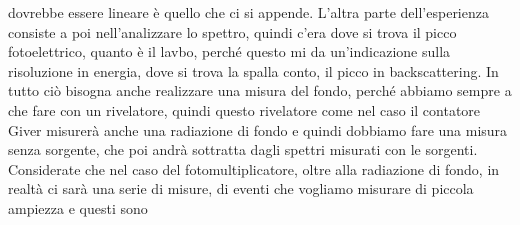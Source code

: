 dovrebbe essere lineare è quello che ci si appende. L'altra parte dell'esperienza consiste a poi nell'analizzare lo spettro, quindi c'era dove si trova il picco fotoelettrico, quanto è il lavbo, perché questo mi da un'indicazione sulla risoluzione in energia, dove si trova la spalla conto, il picco in backscattering. In tutto ciò bisogna anche realizzare una misura del fondo, perché abbiamo sempre a che fare con un rivelatore, quindi questo rivelatore come nel caso il contatore Giver misurerà anche una radiazione di fondo e quindi dobbiamo fare una misura senza sorgente, che poi andrà sottratta dagli spettri misurati con le sorgenti. Considerate che nel caso del fotomultiplicatore, oltre alla radiazione di fondo, in realtà ci sarà una serie di misure, di eventi che vogliamo misurare di piccola ampiezza e questi sono 

